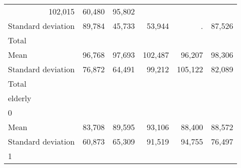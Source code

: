 \begin{tabular}{llllll}
  \multicolumn{1}{r}{102,015} &
  \multicolumn{1}{r}{60,480} &
  \multicolumn{1}{r}{95,802} \\
\multicolumn{1}{l}{\hspace{4em}Standard deviation} &
  \multicolumn{1}{|r}{89,784} &
  \multicolumn{1}{r}{45,733} &
  \multicolumn{1}{r}{53,944} &
  \multicolumn{1}{r}{.} &
  \multicolumn{1}{r}{87,526} \\
\multicolumn{1}{l}{\hspace{3em}Total} &
  \multicolumn{1}{|r}{} &
  \multicolumn{1}{r}{} &
  \multicolumn{1}{r}{} &
  \multicolumn{1}{r}{} &
  \multicolumn{1}{r}{} \\
\multicolumn{1}{l}{\hspace{4em}Mean} &
  \multicolumn{1}{|r}{96,768} &
  \multicolumn{1}{r}{97,693} &
  \multicolumn{1}{r}{102,487} &
  \multicolumn{1}{r}{96,207} &
  \multicolumn{1}{r}{98,306} \\
\multicolumn{1}{l}{\hspace{4em}Standard deviation} &
  \multicolumn{1}{|r}{76,872} &
  \multicolumn{1}{r}{64,491} &
  \multicolumn{1}{r}{99,212} &
  \multicolumn{1}{r}{105,122} &
  \multicolumn{1}{r}{82,089} \\
\multicolumn{1}{l}{\hspace{1em}Total} &
  \multicolumn{1}{|r}{} &
  \multicolumn{1}{r}{} &
  \multicolumn{1}{r}{} &
  \multicolumn{1}{r}{} &
  \multicolumn{1}{r}{} \\
\multicolumn{1}{l}{\hspace{2em}elderly} &
  \multicolumn{1}{|r}{} &
  \multicolumn{1}{r}{} &
  \multicolumn{1}{r}{} &
  \multicolumn{1}{r}{} &
  \multicolumn{1}{r}{} \\
\multicolumn{1}{l}{\hspace{3em}0} &
  \multicolumn{1}{|r}{} &
  \multicolumn{1}{r}{} &
  \multicolumn{1}{r}{} &
  \multicolumn{1}{r}{} &
  \multicolumn{1}{r}{} \\
\multicolumn{1}{l}{\hspace{4em}Mean} &
  \multicolumn{1}{|r}{83,708} &
  \multicolumn{1}{r}{89,595} &
  \multicolumn{1}{r}{93,106} &
  \multicolumn{1}{r}{88,400} &
  \multicolumn{1}{r}{88,572} \\
\multicolumn{1}{l}{\hspace{4em}Standard deviation} &
  \multicolumn{1}{|r}{60,873} &
  \multicolumn{1}{r}{65,309} &
  \multicolumn{1}{r}{91,519} &
  \multicolumn{1}{r}{94,755} &
  \multicolumn{1}{r}{76,497} \\
\multicolumn{1}{l}{\hspace{3em}1} &

\end{tabular}
